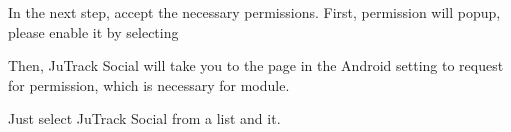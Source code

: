 \documentclass[letterpaper,10pt,english]{sphinxmanual}
\begin{document}
In the next step, accept the necessary permissions. First, {\hyperref[\detokenize{JuTrack_Social:labellocationservice}]{}}  permission will pop\sphinxhyphen{}up, please enable it by selecting 

\begin{DUlineblock}{0em}
\item[] 
\end{DUlineblock}


\begin{DUlineblock}{0em}
\item[] 
\end{DUlineblock}

Then, JuTrack Social will take you to the  page in the Android setting to request for permission, which is necessary for {\hyperref[\detokenize{JuTrack_Social:labelapplicationusagestatistics}]{}} module.

\begin{DUlineblock}{0em}
\item[] 
\end{DUlineblock}


\begin{DUlineblock}{0em}
\item[] 
\end{DUlineblock}

Just select JuTrack Social from a list and  it.

\begin{DUlineblock}{0em}
\item[] 
\end{DUlineblock}


\begin{DUlineblock}{0em}
\item[] 
\end{DUlineblock}
\end{document}
